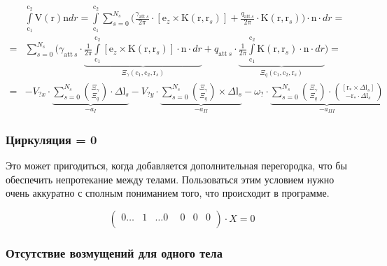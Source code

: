 \documentclass[14pt]{extreport}
\newcommand{\br}[1]{\boldsymbol{\mathrm{#1}}}
\renewcommand{\vec}[1]{\br{#1}}
\newcommand{\att}{\text{att}}
\begin{document}
\begin{equation}
\begin{split}
&\int\limits_{\vec c_1}^{\vec c_2} {\vec V(\vec r)\vec n dr}
= \int\limits_{\vec c_1}^{\vec c_2} {
	\sum\limits_{s=0}^{N_s} {
		\biggl (
		\frac{\gamma_{\att~s}}{2\pi} \cdot [\vec e_z \times \vec K(\vec r, \vec r_s)] +
		\frac{q_{\att~s}}{2\pi} \cdot \vec K(\vec r, \vec r_s)
		\biggr )
	}
	\cdot \vec n \cdot  dr
} = \\ =
&\sum\limits_{s=0}^{N_s} {
	\biggl (
	\gamma_{\att~s} \cdot 
	\underbrace{
	\frac{1}{2\pi}
	\int\limits_{\vec c_1}^{\vec c_2} {
		[\vec e_z \times \vec K(\vec r, \vec r_s)] \cdot \vec n \cdot dr
	}}_{\Xi_\gamma(\vec c_1, \vec c_2, \vec r_s)} + 
	q_{\att~s} \cdot
	\underbrace{
	\frac{1}{2\pi}
	\int\limits_{\vec c_1}^{\vec c_2} {
		\vec K(\vec r, \vec r_s) \cdot \vec n \cdot dr
	}}_{\Xi_q(\vec c_1, \vec c_2, \vec r_s)}
	\biggr )
} = \\ =
&-V_{?x} \cdot \underbrace{
	\sum\limits_{s=0}^{N_s} {\binom{\Xi_\gamma}{\Xi_q} \cdot \Delta \vec l_s}
}_{-a_I}
-V_{?y} \cdot \underbrace{
	\sum\limits_{s=0}^{N_s} {\binom{\Xi_\gamma}{\Xi_q} \times \Delta \vec l_s}
}_{-a_{II}}
-\omega_? \cdot \underbrace{
	\sum\limits_{s=0}^{N_s} {\binom{\Xi_\gamma}{\Xi_q} \cdot \binom{[\vec r_* \times \Delta \vec l_s]}{-\vec r_* \cdot \Delta \vec l_s}}
}_{-a_{III}}
\end{split}
\end{equation}

\subsubsection{Циркуляция = 0}
\label{slau_zero}

Это может пригодиться, когда добавляется дополнительная перегородка, что бы обеспечить непротекание между телами.
Пользоваться этим условием нужно очень аккуратно с сполным пониманием того, что происходит в программе.

\begin{equation*}
\left(\begin{matrix}
0\dotsc& 1& \dotsc 0& ~~0& 0& 0\\
\end{matrix}\right)
\cdot X = 0
\end{equation*}

\subsubsection{Отсутствие возмущений для одного тела}
\label{slau_steady}
\end{document}
